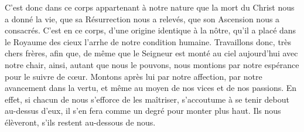 C’est donc dans ce corps appartenant à notre nature
	que la mort du Christ nous a donné la vie,
	que sa Résurrection nous a relevés,
	que son Ascension nous a consacrés.
C’est en ce corps, d’une origine identique à la nôtre,
	qu’il a placé dans le Royaume des cieux l’arrhe de notre condition humaine.
Travaillons donc, très chers frères,
	afin que, de même que le Seigneur est monté au ciel aujourd’hui
		avec notre chair,
	ainsi, autant que nous le pouvons, nous montions par notre espérance
	pour le suivre de cœur.
Montons après lui par notre affection, par notre avancement dans la vertu,
	et même au moyen de nos vices et de nos passions.
En effet, si chacun de nous s’efforce de les maîtriser,
	s’accoutume à se tenir debout au-dessus d’eux,
	il s’en fera comme un degré pour monter plus haut.
Ils nous élèveront, s’ils restent au-dessous de nous.
